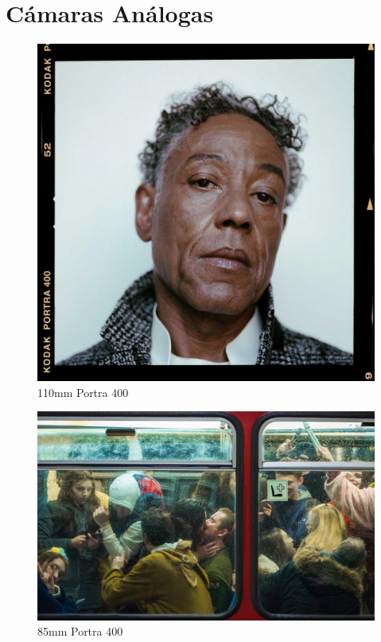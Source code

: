 \documentclass{article}
\begin{document}
\section{Cámaras Análogas}

\begin{figure}[H]
	\centering
	\includegraphics[width=0.85\linewidth]{Figuras/Film_Photo_1}
	\caption{110mm Portra 400}
	\label{fig:filmphoto1}
\end{figure}

\begin{figure}[H]
	\centering
	\includegraphics[width=0.85\linewidth]{Figuras/Film_Photo_2}
	\caption{85mm Portra 400}
	\label{fig:filmphoto2}
\end{figure}
\end{document}
